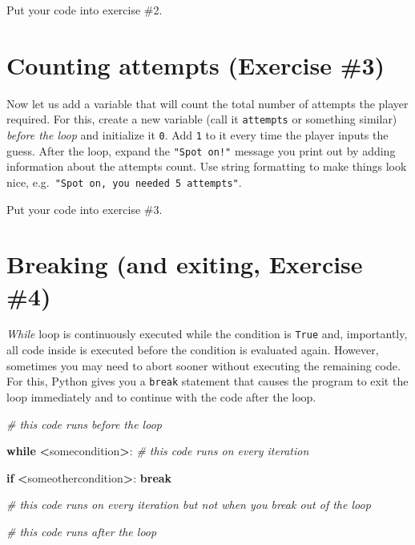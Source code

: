 \documentclass[
]{book}
\newenvironment{Shaded}{\begin{snugshade}}{\end{snugshade}}
\newcommand{\CommentTok}[1]{\textcolor[rgb]{0.56,0.35,0.01}{\textit{#1}}}
\newcommand{\ControlFlowTok}[1]{\textcolor[rgb]{0.13,0.29,0.53}{\textbf{#1}}}
\newcommand{\NormalTok}[1]{#1}
\newcommand{\OperatorTok}[1]{\textcolor[rgb]{0.81,0.36,0.00}{\textbf{#1}}}
\begin{document}
Put your code into exercise \#2.

\hypertarget{counting-attempts-exercise-3}{%
\section{Counting attempts (Exercise \#3)}\label{counting-attempts-exercise-3}}

Now let us add a variable that will count the total number of attempts the player required. For this, create a new variable (call it \texttt{attempts} or something similar) \emph{before the loop} and initialize it \texttt{0}. Add \texttt{1} to it every time the player inputs the guess. After the loop, expand the \texttt{"Spot\ on!"} message you print out by adding information about the attempts count. Use string formatting to make things look nice, e.g.~\texttt{"Spot\ on,\ you\ needed\ 5\ attempts"}.

Put your code into exercise \#3.

\hypertarget{break}{%
\section{Breaking (and exiting, Exercise \#4)}\label{break}}

\emph{While} loop is continuously executed while the condition is \texttt{True} and, importantly, all code inside is executed before the condition is evaluated again. However, sometimes you may need to abort sooner without executing the remaining code. For this, Python gives you a \texttt{break} statement that causes the program to exit the loop immediately and to continue with the code after the loop.

\begin{Shaded}
\begin{Highlighting}[]
\CommentTok{\# this code runs before the loop}

\ControlFlowTok{while} \OperatorTok{\textless{}}\NormalTok{somecondition}\OperatorTok{\textgreater{}}\NormalTok{:}
  \CommentTok{\# this code runs on every iteration}
  
    \ControlFlowTok{if} \OperatorTok{\textless{}}\NormalTok{someothercondition}\OperatorTok{\textgreater{}}\NormalTok{:}
        \ControlFlowTok{break}
  
  \CommentTok{\# this code runs on every iteration but not when you break out of the loop}

\CommentTok{\# this code runs after the loop}
\end{Highlighting}
\end{Shaded}
\end{document}

